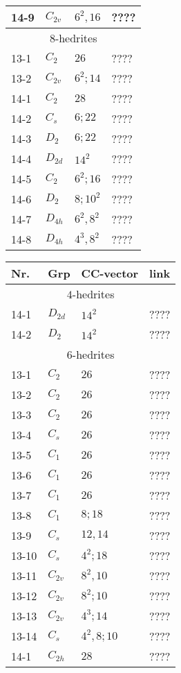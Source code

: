 \documentclass[12pt]{article}
\begin{document}
\begin{table}
\begin{center}
{\begin{minipage}{6cm}
\begin{tabular}{||l|l|l|l||}
14-9	&$C_{2v}$	&$6^2, 16$	&????\\\hline
\hline
\multicolumn{4}{||c||}{$8$-hedrites}\\\hline
13-1	&$C_2$	&$26$		&????\\
13-2	&$C_{2v}$	&$6^2; 14$	&????\\\hline
14-1	&$C_2$	&$28$		&????\\
14-2	&$C_s$	&$6; 22$		&????\\
14-3	&$D_2$	&$6; 22$		&????\\
14-4	&$D_{2d}$	&$14^2$		&????\\
14-5	&$C_2$	&$6^2; 16$	&????\\
14-6	&$D_2$	&$8; 10^2$	&????\\
14-7	&$D_{4h}$	&$6^2, 8^2$	&????\\
14-8	&$D_{4h}$	&$4^3, 8^2$	&????\\\hline
\end{tabular}
\end{minipage}
\begin{minipage}[t]{6cm}
\begin{tabular}{||l|l|l|l||}
\hline
Nr.	&Grp 	&CC-vector	&link\\\hline
\multicolumn{4}{||c||}{$4$-hedrites}\\\hline
14-1	&$D_{2d}$	&$14^2$		&????\\\hline
14-2	&$D_2$	&$14^2$		&????\\	
\hline
\multicolumn{4}{||c||}{$6$-hedrites}\\\hline
13-1	&$C_2$	&$26$		&????\\
13-2 	&$C_2$	&$26$		&????\\
13-3 	&$C_2$	&$26$		&????\\
13-4 	&$C_s$	&$26$		&????\\
13-5 	&$C_1$	&$26$		&????\\
13-6	&$C_1$	&$26$		&????\\
13-7	&$C_1$	&$26$		&????\\
13-8	&$C_1$	&$8; 18$		&????\\
13-9	&$C_s$	&$12, 14$		&????\\
13-10	&$C_s$	&$4^2; 18$	&????\\
13-11	&$C_{2v}$	&$8^2, 10$	&????\\
13-12	&$C_{2v}$	&$8^2; 10$	&????\\
13-13	&$C_{2v}$	&$4^3; 14$	&????\\
13-14	&$C_s$	&$4^2,8;10$	&????\\\hline
14-1 	&$C_{2h}$	&$28$		&????\\

\end{tabular}
\end{minipage}}
\end{center}
\end{table}
\end{document}
